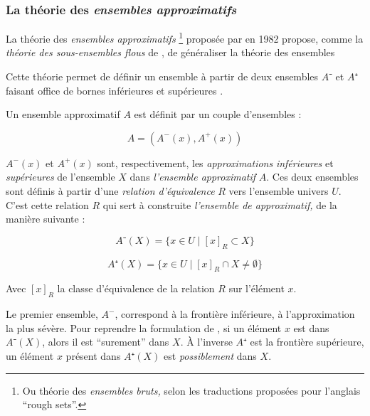 
\subsubsection{La théorie des \emph{ensembles approximatifs}}


La théorie des \emph{ensembles approximatifs} \footnote{Ou théorie des
  \emph{ensembles bruts,} selon les traductions proposées pour
  l'anglais \enquote{rough sets}.} proposée par \textcite{Pawlak} en
1982 propose, comme la \emph{théorie des sous-ensembles flous} de
\textcite{Zadeh1965}, de généraliser la théorie des ensembles

Cette théorie permet de définir un ensemble à partir de deux ensembles
$A⁻$ et $A⁺$ faisant office de bornes inférieures et supérieures
\autocite{Gacogne1997}.

Un ensemble approximatif $A$ est définit par un couple d'ensembles :

\begin{equation}
  A = (A^-(x),A^+(x))  
\end{equation}

$A^-(x)$ et $A^+(x)$ sont, respectivement, les \emph{approximations}
\emph{inférieures} et \emph{supérieures} de l'ensemble $X$ dans
\emph{l'ensemble approximatif} $A$. Ces deux ensembles sont définis à
partir d'une \emph{relation d'équivalence} $R$ vers l'ensemble univers
$U$. C'est cette relation $R$ qui sert à construite \emph{l'ensemble
  de approximatif,} de la manière suivante :

\begin{equation}
  A⁻(X) = \{ x ∈ U ∣ [x]_R ⊂ X \}
\end{equation}

\begin{equation}
  A⁺(X) = \{ x ∈ U ∣ [x]_R ∩ X ≠ ∅ \}
\end{equation}

Avec $[x]_R$ la classe d'équivalence de la relation $R$ sur l'élément
$x$.

Le premier ensemble, $A^-$, correspond à la frontière inférieure, à
l'approximation la plus sévère. Pour reprendre la formulation de
\textcite{Pawlak1985}, si un élément $x$ est dans $A⁻(X)$, alors il
est \enquote{surement} dans $X$. À l'inverse $A⁺$ est la frontière
supérieure, un élément $x$ présent dans $A⁺(X)$ est
\emph{possiblement} dans $X$.


